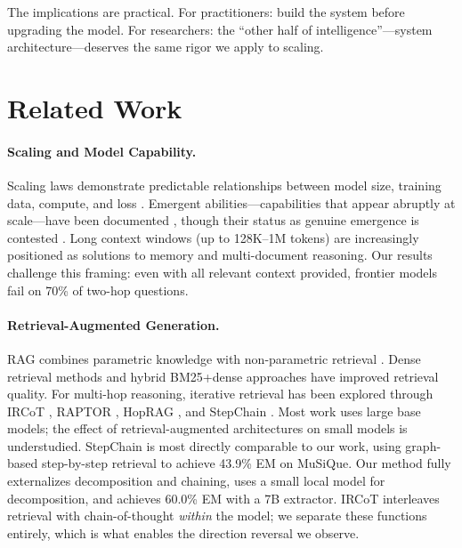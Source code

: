 \documentclass[11pt]{article}
\begin{document}
The implications are practical. For practitioners: build the system before upgrading the model. For researchers: the ``other half of intelligence''---system architecture---deserves the same rigor we apply to scaling.

\section{Related Work}
\label{sec:related}

\paragraph{Scaling and Model Capability.}
Scaling laws demonstrate predictable relationships between model size, training data, compute, and loss \citep{kaplan2020scaling, hoffmann2022training}. Emergent abilities---capabilities that appear abruptly at scale---have been documented \citep{wei2022emergent}, though their status as genuine emergence is contested \citep{schaeffer2023emergent}. Long context windows (up to 128K--1M tokens) are increasingly positioned as solutions to memory and multi-document reasoning. Our results challenge this framing: even with all relevant context provided, frontier models fail on 70\% of two-hop questions.

\paragraph{Retrieval-Augmented Generation.}
RAG combines parametric knowledge with non-parametric retrieval \citep{lewis2020retrieval}. Dense retrieval methods \citep{karpukhin2020dense} and hybrid BM25+dense approaches \citep{ma2023query} have improved retrieval quality. For multi-hop reasoning, iterative retrieval has been explored through IRCoT \citep{trivedi2023interleaving}, RAPTOR \citep{sarthi2024raptor}, HopRAG \citep{li2025hoprag}, and StepChain \citep{wang2025stepchain}. Most work uses large base models; the effect of retrieval-augmented architectures on small models is understudied. StepChain is most directly comparable to our work, using graph-based step-by-step retrieval to achieve 43.9\% EM on MuSiQue. Our method fully externalizes decomposition and chaining, uses a small local model for decomposition, and achieves 60.0\% EM with a 7B extractor. IRCoT interleaves retrieval with chain-of-thought \emph{within} the model; we separate these functions entirely, which is what enables the direction reversal we observe.
\end{document}
